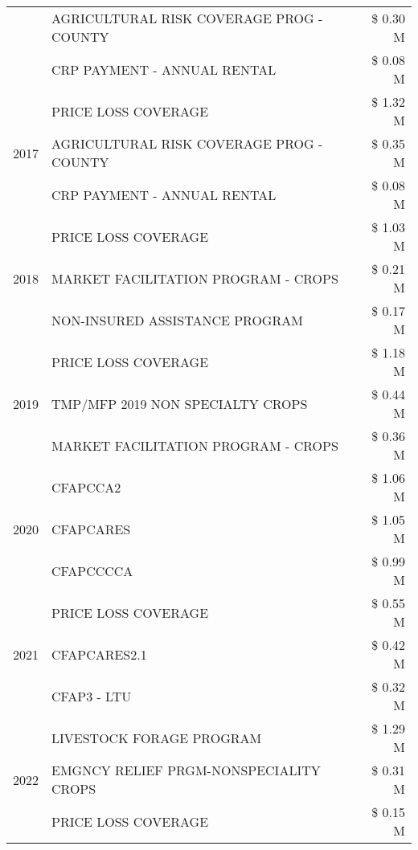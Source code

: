 \begin{tabular}{llr}
 & AGRICULTURAL RISK COVERAGE PROG - COUNTY & \$ 0.30 M \\
 & CRP PAYMENT - ANNUAL RENTAL & \$ 0.08 M \\
\cline{1-3}
\multirow[t]{3}{*}{2017} & PRICE LOSS COVERAGE & \$ 1.32 M \\
 & AGRICULTURAL RISK COVERAGE PROG - COUNTY & \$ 0.35 M \\
 & CRP PAYMENT - ANNUAL RENTAL & \$ 0.08 M \\
\cline{1-3}
\multirow[t]{3}{*}{2018} & PRICE LOSS COVERAGE & \$ 1.03 M \\
 & MARKET FACILITATION PROGRAM - CROPS & \$ 0.21 M \\
 & NON-INSURED ASSISTANCE PROGRAM & \$ 0.17 M \\
\cline{1-3}
\multirow[t]{3}{*}{2019} & PRICE LOSS COVERAGE & \$ 1.18 M \\
 & TMP/MFP 2019 NON SPECIALTY CROPS & \$ 0.44 M \\
 & MARKET FACILITATION PROGRAM - CROPS & \$ 0.36 M \\
\cline{1-3}
\multirow[t]{3}{*}{2020} & CFAPCCA2 & \$ 1.06 M \\
 & CFAPCARES & \$ 1.05 M \\
 & CFAPCCCCA & \$ 0.99 M \\
\cline{1-3}
\multirow[t]{3}{*}{2021} & PRICE LOSS COVERAGE & \$ 0.55 M \\
 & CFAPCARES2.1 & \$ 0.42 M \\
 & CFAP3 - LTU & \$ 0.32 M \\
\cline{1-3}
\multirow[t]{3}{*}{2022} & LIVESTOCK FORAGE PROGRAM & \$ 1.29 M \\
 & EMGNCY RELIEF PRGM-NONSPECIALITY CROPS & \$ 0.31 M \\
 & PRICE LOSS COVERAGE & \$ 0.15 M \\
\cline{1-3}
\bottomrule
\end{tabular}
